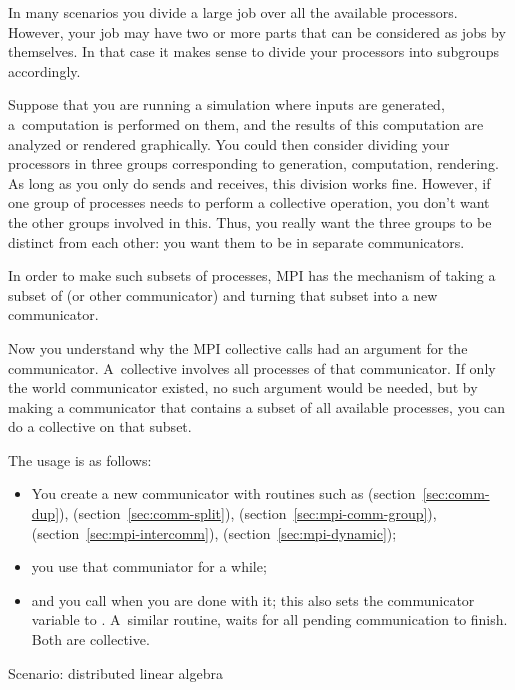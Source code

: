 In many scenarios you divide a large job over all the available processors.
However, your job may have two or more parts that can be considered as
jobs by themselves. In that case it makes sense to divide your processors
into subgroups accordingly.

Suppose that you are running a simulation where inputs are generated,
a~computation is performed on them, and the results of this computation
are analyzed or rendered graphically. You could then consider dividing your
processors in three groups corresponding to generation, computation, rendering.
%
As long as you only do sends and receives, this division works fine. However,
if one group of processes needs to perform a collective operation, you don't
want the other groups involved in this. Thus, you really want the three groups
to be distinct from each other:
you want them to be in separate communicators.

In order to make such subsets of processes, MPI has the mechanism of
taking a subset of 
(or other communicator)
and turning that subset into a new communicator.

Now you understand why the MPI collective calls had an argument for the
communicator. A~collective involves all processes of that communicator.
If only the world communicator existed, no such argument would be needed, but
by making a communicator that contains a subset of all available processes,
you can do a collective on that subset.

The usage is as follows:
\begin{itemize}
\item You create a new communicator with routines such as
   (section~\ref{sec:comm-dup}),
   (section~\ref{sec:comm-split}),
   (section~\ref{sec:mpi-comm-group}),
   (section~\ref{sec:mpi-intercomm}),
   (section~\ref{sec:mpi-dynamic});
\item you use that communiator for a while;
\item and you call  when you are done with it;
  this also sets the communicator variable to .
  A~similar routine,  waits for all pending
  communication to finish. Both are collective.
\end{itemize}

 {Scenario: distributed linear algebra}

